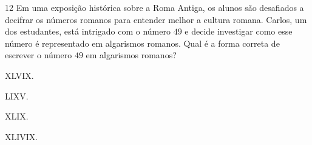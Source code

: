 

\num{12} Em uma exposição histórica sobre a Roma Antiga, os alunos são desafiados
a decifrar os números romanos para entender melhor a cultura romana. Carlos, um
dos estudantes, está intrigado com o número $49$ e decide investigar como esse
número é representado em algarismos romanos. Qual é a forma correta de escrever
o número $49$ em algarismos romanos?

\begin{escolha}
\item XLVIX.

\item LIXV.

\item XLIX.

\item XLIVIX.
\end{escolha}


